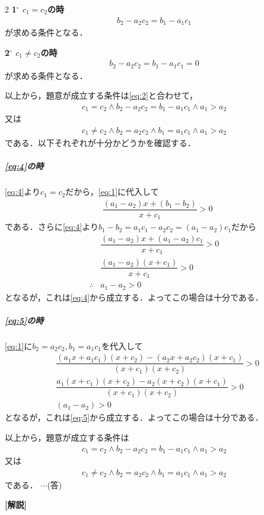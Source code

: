 \documentclass[../../main.tex]{subfiles}
\begin{document}
\begin{multicols}{2}
  \textbf{1$^\circ$ $c_1 = c_2$の時}
  \begin{align}
    b_2 - a_2 c_2 = b_1 - a_1 c_1
  \end{align}
  が求める条件となる．

  \textbf{2$^\circ$ $c_1 \ne c_2$の時}
  \begin{align}
    b_2 - a_2 c_2 = b_1 - a_1 c_1 = 0
  \end{align}
  が求める条件となる．

  以上から，題意が成立する条件は\cref{eq:2}と合わせて，
  \begin{align}
    c_1 = c_2 \land b_2 - a_2 c_2 = b_1 - a_1 c_1 \land a_1 > a_2 \label{eq:4}
  \end{align}
  又は
  \begin{align}
    c_1 \ne c_2 \land b_2 = a_2 c_2 \land b_1 = a_1 c_1 \land a_1 > a_2 \label{eq:5}
  \end{align}
  である．以下それぞれが十分かどうかを確認する．

  \subparagraph{\cref{eq:4}の時}

  \cref{eq:4}より$c_1 = c_2$だから，\cref{eq:1}に代入して
  \begin{align}
    & \dfrac{(a_1-a_2)x + (b_1-b_2)}{x+c_1} > 0
  \end{align}
  である．さらに\cref{eq:4}より$b_1-b_2=a_1c_1-a_2c_2=(a_1-a_2)c_1$だから
  \begin{align}
    & \dfrac{(a_1-a_2)x + (a_1-a_2)c_1}{x+c_1} > 0 \\
    & \dfrac{(a_1-a_2)(x + c_1)}{x+c_1} > 0 \\
    \therefore
    & a_1-a_2 > 0
  \end{align}
  となるが，これは\cref{eq:4}から成立する．よってこの場合は十分である．

  \subparagraph{\cref{eq:5}の時}

  \cref{eq:1}に$b_2 = a_2 c_2, b_1 = a_1 c_1$を代入して
  \begin{align}
    & \dfrac{(a_1 x + a_1c_1)(x + c_2) - (a_2 x + a_2c_2)(x + c_1)}{(x + c_1)(x + c_2)} > 0 \\
    & \dfrac{a_1(x + c_1)(x + c_2) - a_2(x + c_2)(x + c_1)}{(x + c_1)(x + c_2)} > 0  \\
    & (a_1-a_2)>0
  \end{align}
  となるが，これは\cref{eq:5}から成立する．よってこの場合は十分である．
  \casesend

  以上から，題意が成立する条件は
  \begin{align}
    c_1 = c_2 \land b_2 - a_2 c_2 = b_1 - a_1 c_1 \land a_1 > a_2
  \end{align}
  又は
  \begin{align}
    c_1 \ne c_2 \land b_2 = a_2 c_2 \land b_1 = a_1 c_1 \land a_1 > a_2
  \end{align}
  である．  $\cdots$(答)

  {\bf [解説]}

  \newpage
\end{multicols}
\end{document}
